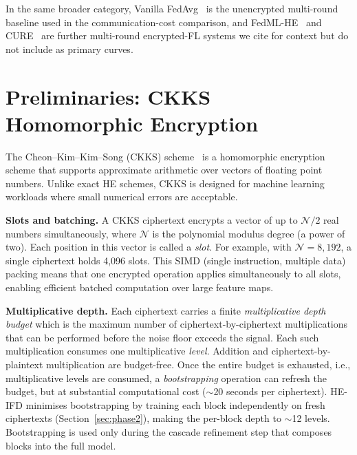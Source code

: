 In the same broader category, Vanilla FedAvg~\cite{mcmahan2017communication} is the unencrypted multi-round baseline used in the communication-cost comparison, and FedML-HE~\cite{jin2023fedml} and CURE~\cite{kanpak2024cure} are further multi-round encrypted-FL systems we cite for context but do not include as primary curves.




\section{Preliminaries: CKKS Homomorphic Encryption}
\label{sec:ckks_prelim}

The Cheon--Kim--Kim--Song (CKKS) scheme~\cite{cheon2017ckks} is a homomorphic encryption scheme that supports approximate arithmetic over vectors of floating point numbers. Unlike exact HE schemes, CKKS is designed for machine learning workloads where small numerical errors are acceptable.

\textbf{Slots and batching.} A CKKS ciphertext encrypts a vector of up to $\mathcal{N}/2$ real numbers simultaneously, where $\mathcal{N}$ is the polynomial modulus degree (a power of two). Each position in this vector is called a \textit{slot}. For example, with $\mathcal{N} = 8{,}192$, a single ciphertext holds 4{,}096 slots. This SIMD (single instruction, multiple data) packing means that one encrypted operation applies simultaneously to all slots, enabling efficient batched computation over large feature maps.

\textbf{Multiplicative depth.} Each ciphertext carries a finite \textit{multiplicative depth budget} which is the maximum number of ciphertext-by-ciphertext multiplications that can be performed before the noise floor exceeds the signal. Each such multiplication consumes one multiplicative \textit{level}. Addition and ciphertext-by-plaintext multiplication are budget-free. Once the entire budget is exhausted, i.e., multiplicative levels are consumed, a \textit{bootstrapping} operation can refresh the budget, but at substantial computational cost (${\sim}$20 seconds per ciphertext). HE-IFD minimises bootstrapping by training each block independently on fresh ciphertexts (Section~\ref{sec:phase2}), making the per-block depth to ${\sim}$12 levels. Bootstrapping is used only during the cascade refinement step that composes blocks into the full model.


